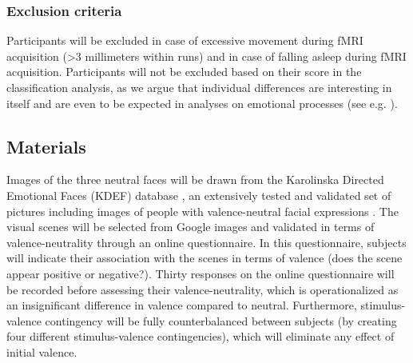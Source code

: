 \documentclass[12pt,a4paper]{article}\usepackage[]{graphicx}\usepackage[]{color}
\begin{document}

\subsubsection{Exclusion criteria}
Participants will be excluded in case of excessive movement during fMRI acquisition (\textgreater 3 millimeters within runs) and in case of falling asleep during fMRI acquisition. Participants will not be excluded based on their score in the classification analysis, as we argue that individual differences are interesting in itself and are even to be expected in analyses on emotional processes (see e.g. \citealp{oosterwijk2015}). 


\subsection{Materials}

Images of the three neutral faces will be drawn from the Karolinska Directed Emotional Faces (KDEF) database \citep{KDEF}, an extensively tested and validated set of pictures including images of people with valence-neutral facial expressions \citep{goeleven2008}. The visual scenes will be selected from Google images and validated in terms of valence-neutrality through an online questionnaire. In this questionnaire, subjects will indicate their association with the scenes in terms of valence (does the scene appear positive or negative?). Thirty responses on the online questionnaire will be recorded before assessing their valence-neutrality, which is operationalized as an insignificant difference in valence compared to neutral. Furthermore, stimulus-valence contingency will be fully counterbalanced between subjects (by creating four different stimulus-valence contingencies), which will eliminate any effect of initial valence.
\end{document}
